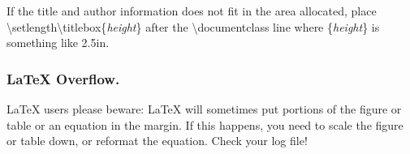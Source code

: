 \documentclass[letterpaper]{article}
\begin{document}
\noindent If the title and author information does not fit in the area allocated, place
\textbackslash setlength\textbackslash titlebox\{\textit{height}\}
after the \textbackslash documentclass line where \{\textit{height}\} is something like 2.5in.


\subsubsection{\LaTeX{} Overflow.}
\LaTeX{} users please beware: \LaTeX{} will sometimes put portions of the figure or table or an equation in the margin. If this happens, you need to scale the figure or table down, or reformat the equation. Check your log file! 




\end{document}

